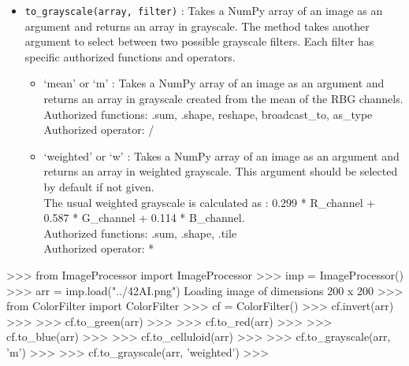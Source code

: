 \documentclass[]{article}
\newenvironment{Shaded}{\begin{snugshade}}{\end{snugshade}}
\newcommand{\DecValTok}[1]{\textcolor[rgb]{0.96,0.45,0.00}{#1}}
\newcommand{\ImportTok}[1]{\textcolor[rgb]{0.15,0.68,0.38}{#1}}
\newcommand{\NormalTok}[1]{\textcolor[rgb]{0.81,0.81,0.76}{#1}}
\newcommand{\OperatorTok}[1]{\textcolor[rgb]{0.81,0.81,0.76}{#1}}
\newcommand{\StringTok}[1]{\textcolor[rgb]{0.96,0.31,0.31}{#1}}
\begin{document}
\begin{itemize}
\item
  \texttt{to\_grayscale(array,\ filter)} : Takes a NumPy array of an
  image as an argument and returns an array in grayscale. The method
  takes another argument to select between two possible grayscale
  filters. Each filter has specific authorized functions and operators.

  \begin{itemize}
  \item
    `mean' or `m' : Takes a NumPy array of an image as an argument and
    returns an array in grayscale created from the mean of the RBG
    channels.\\
    Authorized functions: .sum, .shape, reshape, broadcast\_to,
    as\_type\\
    Authorized operator: /
  \item
    `weighted' or `w' : Takes a NumPy array of an image as an argument
    and returns an array in weighted grayscale. This argument should be
    selected by default if not given.\\
    The usual weighted grayscale is calculated as : 0.299 * R\_channel +
    0.587 * G\_channel + 0.114 * B\_channel.\\
    Authorized functions: .sum, .shape, .tile\\
    Authorized operator: *
  \end{itemize}
\end{itemize}

\begin{Shaded}
\begin{Highlighting}[]
\OperatorTok{>>>} \ImportTok{from}\NormalTok{ ImageProcessor }\ImportTok{import}\NormalTok{ ImageProcessor}
\OperatorTok{>>>}\NormalTok{ imp }\OperatorTok{=}\NormalTok{ ImageProcessor()}
\OperatorTok{>>>}\NormalTok{ arr }\OperatorTok{=}\NormalTok{ imp.load(}\StringTok{"../42AI.png"}\NormalTok{)}
\NormalTok{Loading image of dimensions }\DecValTok{200}\NormalTok{ x }\DecValTok{200}
\OperatorTok{>>>} \ImportTok{from}\NormalTok{ ColorFilter }\ImportTok{import}\NormalTok{ ColorFilter}
\OperatorTok{>>>}\NormalTok{ cf }\OperatorTok{=}\NormalTok{ ColorFilter()}
\OperatorTok{>>>}\NormalTok{ cf.invert(arr)}
\OperatorTok{>>>}
\OperatorTok{>>>}\NormalTok{ cf.to_green(arr)}
\OperatorTok{>>>}
\OperatorTok{>>>}\NormalTok{ cf.to_red(arr)}
\OperatorTok{>>>}
\OperatorTok{>>>}\NormalTok{ cf.to_blue(arr)}
\OperatorTok{>>>}
\OperatorTok{>>>}\NormalTok{ cf.to_celluloid(arr)}
\OperatorTok{>>>}
\OperatorTok{>>>}\NormalTok{ cf.to_grayscale(arr, }\StringTok{'m'}\NormalTok{)}
\OperatorTok{>>>}
\OperatorTok{>>>}\NormalTok{ cf.to_grayscale(arr, }\StringTok{'weighted'}\NormalTok{)}
\OperatorTok{>>>}
\end{Highlighting}
\end{Shaded}
\end{document}
